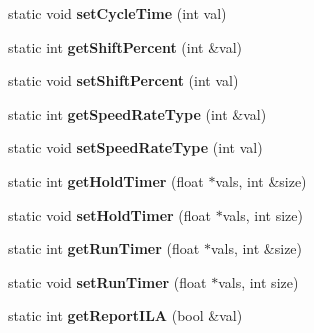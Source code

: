 \begin{DoxyCompactItemize}
\item 
\hypertarget{classRobotConf_a1c0c4d3ca0e96e4f4546762f891449db}{static void {\bfseries set\-Cycle\-Time} (int val)}\label{classRobotConf_a1c0c4d3ca0e96e4f4546762f891449db}

\item 
\hypertarget{classRobotConf_a5947c49bfed8c8a6bd309d731d612549}{static int {\bfseries get\-Shift\-Percent} (int \&val)}\label{classRobotConf_a5947c49bfed8c8a6bd309d731d612549}

\item 
\hypertarget{classRobotConf_a58cdb5ab1e76af8c626a824907ab7d84}{static void {\bfseries set\-Shift\-Percent} (int val)}\label{classRobotConf_a58cdb5ab1e76af8c626a824907ab7d84}

\item 
\hypertarget{classRobotConf_a6fcf7865ef6869e7b4681917f845fa1b}{static int {\bfseries get\-Speed\-Rate\-Type} (int \&val)}\label{classRobotConf_a6fcf7865ef6869e7b4681917f845fa1b}

\item 
\hypertarget{classRobotConf_ab0168486b764207f5dde64342e1dc372}{static void {\bfseries set\-Speed\-Rate\-Type} (int val)}\label{classRobotConf_ab0168486b764207f5dde64342e1dc372}

\item 
\hypertarget{classRobotConf_aa07b918fb75246d78697bee2bd7c7da0}{static int {\bfseries get\-Hold\-Timer} (float $\ast$vals, int \&size)}\label{classRobotConf_aa07b918fb75246d78697bee2bd7c7da0}

\item 
\hypertarget{classRobotConf_ae1a4a243c1e1bdb90102de9eef0ec721}{static void {\bfseries set\-Hold\-Timer} (float $\ast$vals, int size)}\label{classRobotConf_ae1a4a243c1e1bdb90102de9eef0ec721}

\item 
\hypertarget{classRobotConf_a544fc52255e3b896e6b9b5e6aae1685f}{static int {\bfseries get\-Run\-Timer} (float $\ast$vals, int \&size)}\label{classRobotConf_a544fc52255e3b896e6b9b5e6aae1685f}

\item 
\hypertarget{classRobotConf_a78f0fb9f0549eb8048794f7b4d3974a5}{static void {\bfseries set\-Run\-Timer} (float $\ast$vals, int size)}\label{classRobotConf_a78f0fb9f0549eb8048794f7b4d3974a5}

\item 
\hypertarget{classRobotConf_a075f37a0dfa07e67e166743ee9ae2d9a}{static int {\bfseries get\-Report\-I\-L\-A} (bool \&val)}\label{classRobotConf_a075f37a0dfa07e67e166743ee9ae2d9a}


\end{DoxyCompactItemize}
